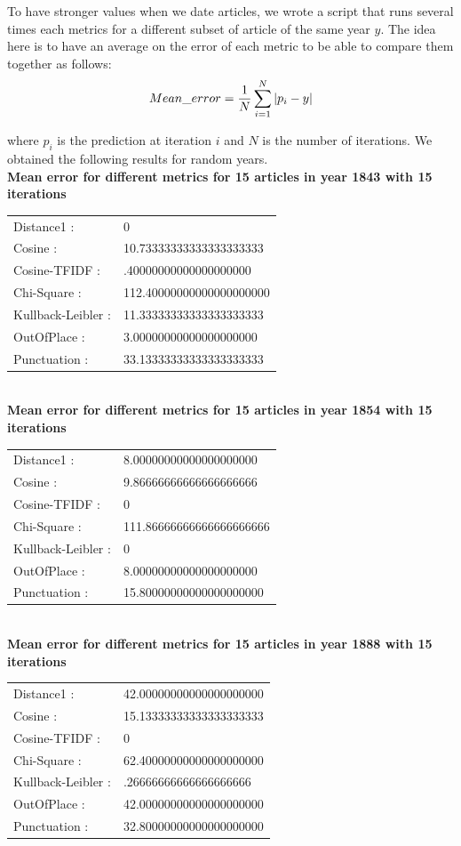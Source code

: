 To have stronger values when we date articles, we wrote a script that runs several times each metrics for a different subset of article of the same year $y$. The idea here is to have an average on the error of each metric to be able to compare them together as follows:
\[
 Mean\_ error = \frac{1}{N} \sum_{i=1}^N \arrowvert p_i - y \arrowvert
\]

where $p_i$ is the prediction at iteration $i$ and $N$ is the number of iterations. We obtained the following results for random years.\\

\textbf{Mean error for different metrics for 15 articles in year 1843 with 15 iterations}\\
\begin{tabular}{p{3cm} p{5cm}}
Distance1 :& 0\\
Cosine :& 10.73333333333333333333\\
Cosine-TFIDF :& .40000000000000000000\\
Chi-Square :& 112.40000000000000000000\\
Kullback-Leibler :& 11.33333333333333333333\\
OutOfPlace :& 3.00000000000000000000\\
Punctuation :& 33.13333333333333333333\\
\end{tabular}\\
 
\textbf{Mean error for different metrics for 15 articles in year 1854 with 15 iterations}\\
\begin{tabular}{p{3cm} p{5cm}}
    Distance1 :& 8.00000000000000000000\\
    Cosine :& 9.86666666666666666666\\
    Cosine-TFIDF :& 0\\
    Chi-Square :& 111.86666666666666666666\\
    Kullback-Leibler :& 0\\
    OutOfPlace :& 8.00000000000000000000\\
    Punctuation :& 15.80000000000000000000\\
\end{tabular}\\
 
\textbf{Mean error for different metrics for 15 articles in year 1888 with 15 iterations}\\
\begin{tabular}{p{3cm} p{5cm}}
    Distance1 :& 42.00000000000000000000\\
    Cosine :& 15.13333333333333333333\\
    Cosine-TFIDF :& 0\\
    Chi-Square :& 62.40000000000000000000\\
    Kullback-Leibler :& .26666666666666666666\\
    OutOfPlace :& 42.00000000000000000000\\
    Punctuation :& 32.80000000000000000000\\
\end{tabular}\\
 
